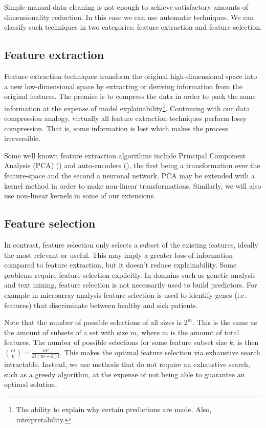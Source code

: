 Simple manual data cleaning is not enough to achieve satisfactory amounts of dimensionality reduction. In this case we can use automatic techniques. We can classify such techniques in two categories: feature extraction and feature selection.

\subsection{Feature extraction}

Feature extraction techniques transform the original high-dimensional space into a new low-dimensional space by extracting or deriving information from the original features. The premise is to compress the data in order to pack the same information at the expense of model explainability\footnote{The ability to explain why certain predictions are made. Also, interpretability.}. Continuing with our data compression analogy, virtually all feature extraction techniques perform lossy com\-pres\-sion. That is, some information is lost which makes the process irreversible. 

Some well known feature extraction algorithms include Principal Component Analysis (PCA) (\cite{scholkopf_kernel_1997}) and auto-encoders (\cite{vincent_extracting_2008}), the first being a transformation over the feature-space and the second a neuronal network. PCA may be extended with a kernel method in order to make non-linear transformations. Similarly, we will also use non-linear kernels in some of our extensions.

\subsection{Feature selection}
\label{sec:ch1.feature_selection}

In contrast, feature selection only selects a subset of the existing features, ideally the most relevant or useful. This may imply a greater loss of information compared to feature extraction, but it doesn't reduce explainability. Some problems require feature selection explicitly. In domains such as genetic analysis and text mining, feature selection is not necessarily used to build predictors. For example in micro\-array analysis feature selection is used to identify genes (i.e. features) that dis\-criminate between healthy and sick patients. 

Note that the number of possible selections of all sizes is $2^m$. This is the same as the amount of subsets of a set with size $m$, where $m$ is the amount of total features. The number of possible selections for some feature subset size $k$, is then ${m \choose k} = \frac{m!}{k!(m - k)!}$. This makes the optimal feature selection via exhaustive search intractable. Instead, we use methods that do not require an exhaustive search, such as a greedy algorithm, at the expense of not being able to guarantee an optimal solution.

